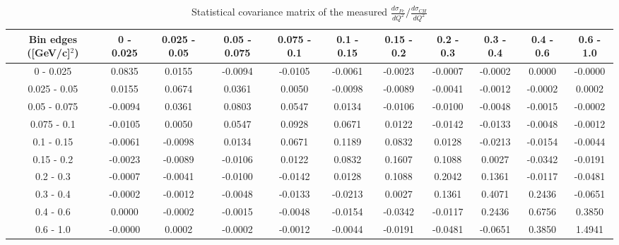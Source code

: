 \documentclass[aps,prl,twocolumn,superscriptaddress,nofootinbib]{revtex4-1}
\begin{document}
\begin{table}[h!]
  \centering
  \caption{Statistical covariance matrix of the measured $\frac{d\sigma_{Fe}}{dQ^{2}}/\frac{d\sigma_{CH}}{dQ^{2}}$}
    \begin{tabular}{c||cccccccccc}
      Bin edges ([GeV/c]$^{2}$) & 0 - 0.025 & 0.025 - 0.05 & 0.05 - 0.075 & 0.075 - 0.1 & 0.1 - 0.15 & 0.15 - 0.2 & 0.2 - 0.3 & 0.3 - 0.4 & 0.4 - 0.6 & 0.6 - 1.0 \\
\hline \hline
         0 - 0.025 &  0.0835 &  0.0155 & -0.0094 & -0.0105 & -0.0061 & -0.0023 & -0.0007 & -0.0002 &  0.0000 & -0.0000 \\
      0.025 - 0.05 &  0.0155 &  0.0674 &  0.0361 &  0.0050 & -0.0098 & -0.0089 & -0.0041 & -0.0012 & -0.0002 &  0.0002 \\
      0.05 - 0.075 & -0.0094 &  0.0361 &  0.0803 &  0.0547 &  0.0134 & -0.0106 & -0.0100 & -0.0048 & -0.0015 & -0.0002 \\
       0.075 - 0.1 & -0.0105 &  0.0050 &  0.0547 &  0.0928 &  0.0671 &  0.0122 & -0.0142 & -0.0133 & -0.0048 & -0.0012 \\
        0.1 - 0.15 & -0.0061 & -0.0098 &  0.0134 &  0.0671 &  0.1189 &  0.0832 &  0.0128 & -0.0213 & -0.0154 & -0.0044 \\
        0.15 - 0.2 & -0.0023 & -0.0089 & -0.0106 &  0.0122 &  0.0832 &  0.1607 &  0.1088 &  0.0027 & -0.0342 & -0.0191 \\
         0.2 - 0.3 & -0.0007 & -0.0041 & -0.0100 & -0.0142 &  0.0128 &  0.1088 &  0.2042 &  0.1361 & -0.0117 & -0.0481 \\
         0.3 - 0.4 & -0.0002 & -0.0012 & -0.0048 & -0.0133 & -0.0213 &  0.0027 &  0.1361 &  0.4071 &  0.2436 & -0.0651 \\
         0.4 - 0.6 &  0.0000 & -0.0002 & -0.0015 & -0.0048 & -0.0154 & -0.0342 & -0.0117 &  0.2436 &  0.6756 &  0.3850 \\
         0.6 - 1.0 & -0.0000 &  0.0002 & -0.0002 & -0.0012 & -0.0044 & -0.0191 & -0.0481 & -0.0651 &  0.3850 &  1.4941 \\
    \end{tabular}
  \label{tablecov:Fe_Statistical_Q2}
\end{table}
\end{document}
